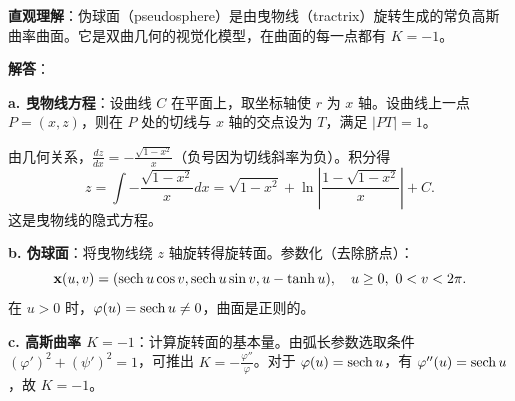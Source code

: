 \begin{solution}
\textbf{直观理解}：伪球面（pseudosphere）是由曳物线（tractrix）旋转生成的常负高斯曲率曲面。它是双曲几何的视觉化模型，在曲面的每一点都有 $K = -1$。

\textbf{解答}：

\textbf{a. 曳物线方程}：设曲线 $C$ 在平面上，取坐标轴使 $r$ 为 $x$ 轴。设曲线上一点 $P = (x, z)$，则在 $P$ 处的切线与 $x$ 轴的交点设为 $T$，满足 $|PT| = 1$。

由几何关系，$\frac{dz}{dx} = -\frac{\sqrt{1-x^2}}{x}$（负号因为切线斜率为负）。积分得
\[
z = \int -\frac{\sqrt{1-x^2}}{x} dx = \sqrt{1-x^2} + \ln\left|\frac{1-\sqrt{1-x^2}}{x}\right| + C.
\]
这是曳物线的隐式方程。

\textbf{b. 伪球面}：将曳物线绕 $z$ 轴旋转得旋转面。参数化（去除脐点）：
\[
\mathbf{x}(u,v) = (\operatorname{sech} u \cos v, \operatorname{sech} u \sin v, u - \tanh u),\quad u \geq 0,\ 0 < v < 2\pi.
\]
在 $u > 0$ 时，$\varphi(u) = \operatorname{sech} u \neq 0$，曲面是正则的。

\textbf{c. 高斯曲率 $K = -1$}：计算旋转面的基本量。由弧长参数选取条件 $(\varphi')^2 + (\psi')^2 = 1$，可推出 $K = -\frac{\varphi''}{\varphi}$。对于 $\varphi(u) = \operatorname{sech} u$，有 $\varphi''(u) = \operatorname{sech} u$，故 $K = -1$。
\end{solution}

